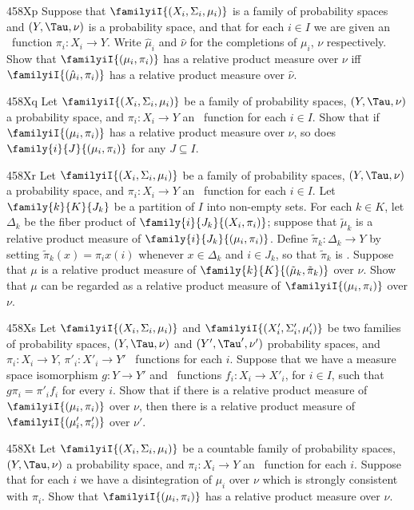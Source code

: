 {\spheader 458Xp Suppose that $\familyiI{(X_i,\Sigma_i,\mu_i)}$ is a
family of probability spaces and $(Y,\Tau,\nu)$ is a probability space,
and that for each $i\in I$ we are given an \imp\ function
$\pi_i:X_i\to Y$.   Write $\hat\mu_i$ and
$\hat\nu$ for the completions of $\mu_i$, $\nu$ respectively.   Show
that $\familyiI{(\mu_i,\pi_i)}$ has a relative product measure over
$\nu$ iff $\familyiI{(\hat\mu_i,\pi_i)}$ has a relative product measure
over $\hat\nu$.

\spheader 458Xq Let $\familyiI{(X_i,\Sigma_i,\mu_i)}$ be a
family of probability spaces, $(Y,\Tau,\nu)$ a probability space, and
$\pi_i:X_i\to Y$ an \imp\ function for each $i\in I$.   Show that if
$\familyiI{(\mu_i,\pi_i)}$ has a relative product measure over $\nu$, so
does $\family{i}{J}{(\mu_i,\pi_i)}$ for any $J\subseteq I$.

\spheader 458Xr Let $\familyiI{(X_i,\Sigma_i,\mu_i)}$ be a
family of probability spaces, $(Y,\Tau,\nu)$ a probability space, and
$\pi_i:X_i\to Y$ an \imp\ function for each $i\in I$.   Let
$\family{k}{K}{J_k}$ be a partition of $I$ into non-empty sets.   For
each $k\in K$, let $\Delta_k$ be the fiber product of
$\family{i}{J_k}{(X_i,\pi_i)}$;  suppose that $\tilde\mu_k$ is a
relative product measure of $\family{i}{J_k}{(\mu_i,\pi_i)}$.
Define $\tilde\pi_k:\Delta_k\to Y$ by
setting $\tilde\pi_k(x)=\pi_ix(i)$ whenever $x\in\Delta_k$ and
$i\in J_k$, so that $\tilde\pi_k$ is \imp.  Suppose that $\mu$ is a
relative product measure of $\family{k}{K}{(\tilde\mu_k,\tilde\pi_k)}$
over $\nu$.   Show that $\mu$ can be regarded as a relative product
measure of $\familyiI{(\mu_i,\pi_i)}$ over $\nu$.

\spheader 458Xs Let $\familyiI{(X_i,\Sigma_i,\mu_i)}$ and
$\familyiI{(X'_i,\Sigma'_i,\mu'_i)}$ be two families of
probability spaces, $(Y,\Tau,\nu)$ and $(Y',\Tau',\nu')$ probability
spaces, and $\pi_i:X_i\to Y$, $\pi'_i:X'_i\to Y'$ \imp\ functions for
each $i$.   Suppose that we have a measure space isomorphism $g:Y\to Y'$
and \imp\ functions $f_i:X_i\to X'_i$, for
$i\in I$, such that $g\pi_i=\pi'_if_i$ for every $i$.   Show that if
there is a relative product measure of $\familyiI{(\mu_i,\pi_i)}$
over $\nu$, then there is a relative product measure of
$\familyiI{(\mu'_i,\pi'_i)}$ over $\nu'$.

\spheader 458Xt
Let $\familyiI{(X_i,\Sigma_i,\mu_i)}$ be a countable
family of probability spaces, $(Y,\Tau,\nu)$ a probability space, and
$\pi_i:X_i\to Y$ an \imp\ function for each $i$.   Suppose that for each
$i$ we have a disintegration of $\mu_i$ over $\nu$ which is strongly
consistent with $\pi_i$.   Show that
$\familyiI{(\mu_i,\pi_i)}$ has a relative product measure over
$\nu$.

}

